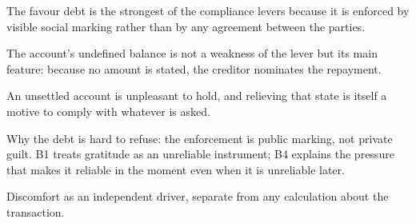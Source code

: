 

\begin{distilled}
  \item The favour debt is the strongest of the compliance levers because it is enforced by visible social marking rather than by any agreement between the parties.
  \item The account's undefined balance is not a weakness of the lever but its main feature: because no amount is stated, the creditor nominates the repayment.
  \item An unsettled account is unpleasant to hold, and relieving that state is itself a motive to comply with whatever is asked.
\end{distilled}

\begin{unique}
  \item Why the debt is hard to refuse: the enforcement is public marking, not private guilt. B1 treats gratitude as an unreliable instrument; B4 explains the pressure that makes it reliable in the moment even when it is unreliable later.
  \item Discomfort as an independent driver, separate from any calculation about the transaction.
\end{unique}
